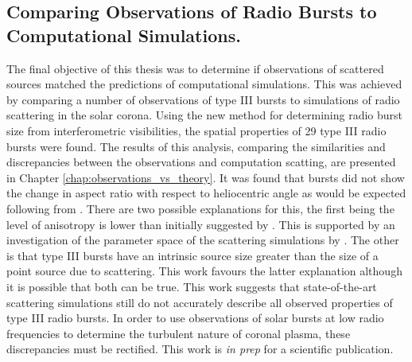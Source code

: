 \subsection{Comparing Observations of Radio Bursts to Computational Simulations.}
The final objective of this thesis was to determine if observations of scattered sources matched the predictions of computational simulations. This was achieved by comparing a number of observations of type III bursts to simulations of radio scattering in the solar corona.
Using the new method for determining radio burst size from interferometric visibilities, the spatial properties of 29 type III radio bursts were found. The results of this analysis, comparing the similarities and discrepancies between the observations and computation scatting, are presented in Chapter \ref{chap:observations_vs_theory}.%
It was found that bursts did not show the change in aspect ratio with respect to heliocentric angle as would be expected following from \cite{Kontar2019}. There are two possible explanations for this, the first being the level of anisotropy is lower than initially suggested by \cite{Kontar2019}. This is supported by an investigation of the parameter space of the scattering simulations by \cite{Zhang2021}. The other is that type III bursts have an intrinsic source size greater than the size of a point source due to scattering. This work favours the latter explanation although it is possible that both can be true. This work suggests that state-of-the-art scattering simulations still do not accurately describe all observed properties of type III radio bursts. In order to use observations of solar bursts at low radio frequencies to determine the turbulent nature of coronal plasma, these discrepancies must be rectified. This work is \textit{in prep} for a scientific publication.

